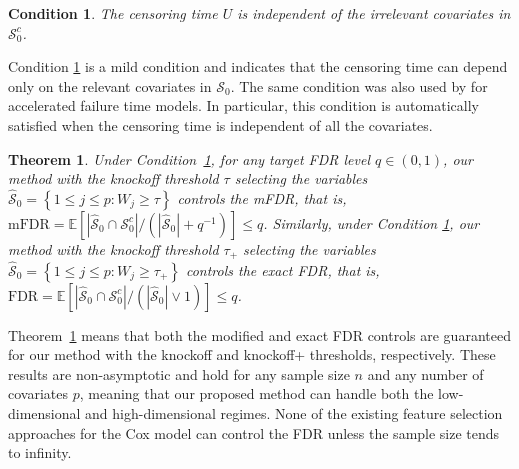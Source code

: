 \documentclass[11pt]{article}
\newtheorem{theorem}{Theorem}%
\newtheorem{condition}{Condition}%
\begin{document}
\begin{condition} \label{Condition1}
	\indent  The censoring time $U$ is independent of the irrelevant covariates in $\mathcal{S}_0^c$.
\end{condition}

Condition \ref{Condition1} is a mild condition and indicates that 
the censoring time can depend only on the relevant covariates in $\mathcal{S}_0$.  
The same condition was also used by \cite{dong2022reproducible} for accelerated failure time models.
In particular, this condition is automatically satisfied when the censoring time is independent of all the covariates.


\begin{theorem}\label{Theorem1}
	Under Condition~\ref{Condition1}, for any target FDR level $q\in(0, 1)$, our method with the knockoff threshold $\tau$ selecting the variables $\widehat{\mathcal{S}}_0=\left\{1\leq j\leq p: W_{j} \ge \tau\right\}$ 	
	controls the mFDR, that is,	$\mathrm{mFDR} = \mathbb{E} \left[|\widehat{\mathcal{S}}_0 \cap \mathcal{S}_0^c|/(|\widehat{\mathcal{S}}_0|+q^{-1})\right]\leq q$.
	Similarly, under Condition \ref{Condition1}, our method with the knockoff threshold $\tau_{+}$ selecting the variables $\widehat{\mathcal{S}}_0=\left\{1\leq j\leq p: W_{j} \ge \tau_{+}\right\}$ 	
	controls the exact FDR, that is, $\mathrm{FDR} = \mathbb{E} \left[|\widehat{\mathcal{S}}_0 \cap \mathcal{S}_0^c|/(|\widehat{\mathcal{S}}_0|\vee 1)\right]\leq q$.	
\end{theorem}

Theorem~\ref{Theorem1} means that both the modified and exact FDR controls are guaranteed for our method with the knockoff and knockoff+ thresholds, respectively. These results are non-asymptotic and hold for  
any sample size $n$ and any number of covariates $p$, meaning that our proposed method
can handle both the low-dimensional and high-dimensional regimes. 
None of the existing feature selection approaches for the Cox model can control the FDR unless the sample size tends to infinity.
\end{document}
